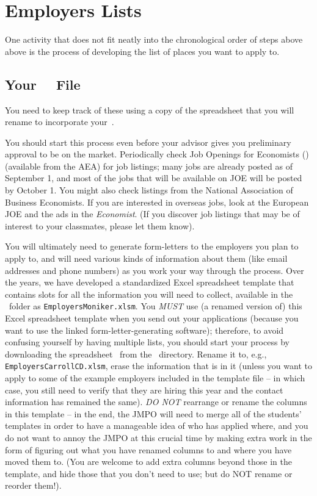 \documentclass{\classes/econtex}
\begin{document}
\section*{Employers Lists}\hypertarget{employers-lists}{}

One activity that does not fit neatly into the chronological order of steps above above is the process of developing the list of places you want to apply to.

\hypertarget{your-emw-file}{}
\subsection*{Your{~\EMW~} File}
You need to keep track of these using a copy of the {\Employers} spreadsheet that you will rename to incorporate your{~\Moniker}.

You should start this process even before your advisor gives you preliminary approval to be on the market.  Periodically check Job Openings for Economists (\JOE) (available from the AEA) for job listings; many jobs are already posted as of September 1, and most of the jobs that will be available on JOE will be posted by October 1.  You might also check listings from the National Association of Business Economists.  If you are interested in overseas jobs, look at the European JOE and the ads in the \textit{Economist}.  (If you discover job listings that may be of interest to your classmates, please let them know).

You will ultimately need to generate form-letters to the employers you plan to apply to, and will need various kinds of information about them (like email addresses and phone numbers) as you work your way through the process.  Over the years, we have developed a standardized Excel spreadsheet template that contains slots for all the information you will need to collect, available in the \Templates~folder as \texttt{EmployersMoniker.xlsm}.  You \textit{MUST} use (a renamed version of) this Excel spreadsheet template when you send out your applications (because you want to use the linked form-letter-generating software); therefore, to avoid confusing yourself by having multiple lists, you should start your process by downloading the spreadsheet {\Employers}~from the \Templatesurl~directory.  Rename it to, e.g., \texttt{EmployersCarrollCD.xlsm}, erase the information that is in it (unless you want to apply to some of the example employers included in the template file -- in which case, you still need to verify that they are hiring this year and the contact information has remained the same).  \textit{DO NOT} rearrange or rename the columns in this template -- in the end, the JMPO will need to merge all of the students' templates in order to have a manageable idea of who has applied where, and you do not want to annoy the JMPO at this crucial time by making extra work in the form of figuring out what you have renamed columns to and where you have moved them to.  (You are welcome to add extra columns beyond those in the template, and hide those that you don't need to use; but do NOT rename or reorder them!).
\end{document}
